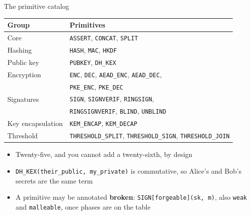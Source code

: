 \ifdefined\PRESENTATION\else\PassOptionsToClass{handout}{beamer}\fi\documentclass[aspectratio=169, lualatex]{beamer}
\begin{document}
\begin{frame}{The primitive catalog}
	\begin{center}
		\scriptsize
		\begin{tabular}{|l|l|}
			\hline
			\textbf{Group}    & \textbf{Primitives}                                                 \\
			\hline
			Core              & \texttt{ASSERT}, \texttt{CONCAT}, \texttt{SPLIT}                    \\
			\hline
			Hashing           & \texttt{HASH}, \texttt{MAC}, \texttt{HKDF}                         \\
			\hline
			Public key        & \texttt{PUBKEY}, \texttt{DH\_KEX}                                   \\
			\hline
			Encryption        & \texttt{ENC}, \texttt{DEC}, \texttt{AEAD\_ENC}, \texttt{AEAD\_DEC},           \\
			                  & \texttt{PKE\_ENC}, \texttt{PKE\_DEC}                                          \\
			\hline
			Signatures        & \texttt{SIGN}, \texttt{SIGNVERIF}, \texttt{RINGSIGN},                         \\
			                  & \texttt{RINGSIGNVERIF}, \texttt{BLIND}, \texttt{UNBLIND}                      \\
			\hline
			Key encapsulation & \texttt{KEM\_ENCAP}, \texttt{KEM\_DECAP}                                      \\
			\hline
			Threshold         & \texttt{THRESHOLD\_SPLIT}, \texttt{THRESHOLD\_SIGN}, \texttt{THRESHOLD\_JOIN} \\
			\hline
		\end{tabular}
	\end{center}
	\vspace{0.3em}
	\footnotesize
	\begin{itemize}
		\item Twenty-five, and you cannot add a twenty-sixth, by design
		\item \texttt{DH\_KEX(their\_public, my\_private)} is commutative, so Alice's and Bob's secrets are the same term
		\item A primitive may be annotated \textbf{broken}: \texttt{SIGN[forgeable](sk, m)}, also \texttt{weak} and \texttt{malleable}, once phases are on the table
	\end{itemize}
\end{frame}
\end{document}
